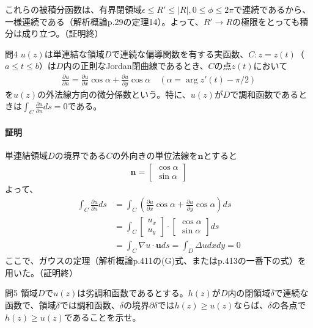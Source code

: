 これらの被積分函数は、有界閉領域$\epsilon\le R'\le|R|,0\le\phi\le2\pi$で連続であるから、一様連続である（解析概論p.29の定理14）。よって、$R'\longrightarrow R$の極限をとっても積分は成り立つ。（証明終）

\newpage
\begin{mysimplebox}{問4}
    $u(z)$は単連結な領域$D$で連続な偏導関数を有する実函数、$C:z=z(t)$（$a\le t\le b$）は$D$内の正則なJordan閉曲線であるとき、$C$の点$z(t)$において
    \begin{align*}
        \frac{\partial u}{\partial n}
        =\frac{\partial u}{\partial x}\cos\alpha
        +\frac{\partial u}{\partial y}\cos\alpha
        \quad(\alpha=\arg z'(t)-\pi/2)
    \end{align*}
    を$u(z)$の外法線方向の微分係数という。特に、$u(z)$が$D$で調和函数であるときは$\int_C\frac{\partial u}{\partial n}ds=0$である。
\end{mysimplebox}
\paragraph{証明}
単連結領域$D$の境界である$C$の外向きの単位法線を$\bm{n}$とすると
\begin{align*}
    \bm{n}=\begin{bmatrix}
        \cos\alpha\\\sin\alpha
    \end{bmatrix}
\end{align*}
よって、
\begin{align*}
    \int_C\frac{\partial u}{\partial n}ds
    &=\int_C(\frac{\partial u}{\partial x}\cos\alpha
    +\frac{\partial u}{\partial y}\cos\alpha)ds\\
    &=\int_C
    \begin{bmatrix}
        u_x\\u_y
    \end{bmatrix}
    \cdot\begin{bmatrix}
        \cos\alpha\\\sin\alpha
    \end{bmatrix}ds\\
    &=\int_C\nabla u\cdot\bm{u}ds=\int_D\Delta udxdy=0
\end{align*}
ここで、ガウスの定理（解析概論p.411の(G)式、またはp.413の一番下の式）を用いた。（証明終）


\newpage
\begin{mysimplebox}{問5}
    領域$D$で$u(z)$は劣調和函数であるとする。$h(z)$が$D$内の閉領域$\overline{\delta}$で連続な函数で、領域$\delta$では調和函数、$\delta$の境界$\partial\delta$では$h(z)\ge u(z)$ならば、$\delta$の各点で$h(z)\ge u(z)$であることを示せ。
\end{mysimplebox}
